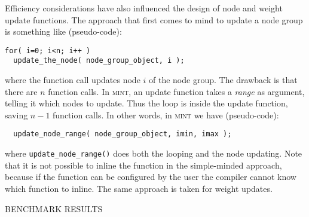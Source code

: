 \documentclass[11pt,letterpaper]{memoir}
\newcommand{\mint}{{\scshape\sffamily mint}\xspace}
\begin{document}
Efficiency considerations have also influenced the design of node and
weight update functions. The approach that first comes to mind to
update a node group is something like (pseudo-code):
\begin{lstlisting}
for( i=0; i<n; i++ )
  update_the_node( node_group_object, i );
\end{lstlisting}
where the function call updates node $i$ of the node group. The
drawback is that there are $n$ function calls. In \mint, an update
function takes a \textit{range} as argument, telling it which nodes to
update. Thus the loop is inside the update function, saving $n-1$
function calls. In other words, in \mint we have 
(pseudo-code):
\begin{lstlisting}
  update_node_range( node_group_object, imin, imax );
\end{lstlisting}
where \lstinline{update_node_range()} does both the looping and the
node updating. Note that it is not possible to inline the function in
the simple-minded approach, because if the function can be configured
by the user the compiler cannot know which function to inline. The
same approach is taken for weight updates.


BENCHMARK RESULTS

\clearpage

\printindex
\end{document}
